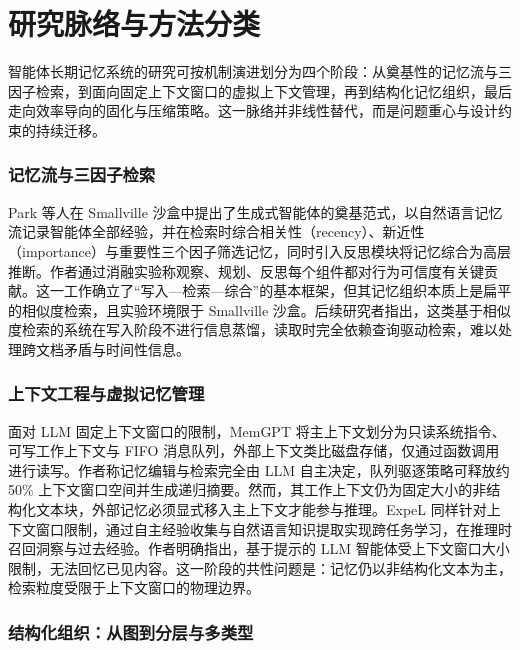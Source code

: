 
\section{研究脉络与方法分类}

智能体长期记忆系统的研究可按机制演进划分为四个阶段：从奠基性的记忆流与三因子检索，到面向固定上下文窗口的虚拟上下文管理，再到结构化记忆组织，最后走向效率导向的固化与压缩策略。这一脉络并非线性替代，而是问题重心与设计约束的持续迁移。

\subsubsection{记忆流与三因子检索}

Park 等人在 Smallville 沙盒中提出了生成式智能体的奠基范式，以自然语言记忆流记录智能体全部经验，并在检索时综合相关性（recency）、新近性（importance）与重要性三个因子筛选记忆，同时引入反思模块将记忆综合为高层推断\cite{W0001}。作者通过消融实验称观察、规划、反思每个组件都对行为可信度有关键贡献\cite{W0001}。这一工作确立了“写入—检索—综合”的基本框架，但其记忆组织本质上是扁平的相似度检索，且实验环境限于 Smallville 沙盒\cite{W0001}。后续研究者指出，这类基于相似度检索的系统在写入阶段不进行信息蒸馏，读取时完全依赖查询驱动检索，难以处理跨文档矛盾与时间性信息\cite{W0028}。

\subsubsection{上下文工程与虚拟记忆管理}

面对 LLM 固定上下文窗口的限制，MemGPT 将主上下文划分为只读系统指令、可写工作上下文与 FIFO 消息队列，外部上下文类比磁盘存储，仅通过函数调用进行读写\cite{W0002}。作者称记忆编辑与检索完全由 LLM 自主决定，队列驱逐策略可释放约 50\% 上下文窗口空间并生成递归摘要\cite{W0002}。然而，其工作上下文仍为固定大小的非结构化文本块，外部记忆必须显式移入主上下文才能参与推理\cite{W0002}。ExpeL 同样针对上下文窗口限制，通过自主经验收集与自然语言知识提取实现跨任务学习，在推理时召回洞察与过去经验\cite{W0618}。作者明确指出，基于提示的 LLM 智能体受上下文窗口大小限制，无法回忆已见内容\cite{W0618}。这一阶段的共性问题是：记忆仍以非结构化文本为主，检索粒度受限于上下文窗口的物理边界。

\subsubsection{结构化组织：从图到分层与多类型}

